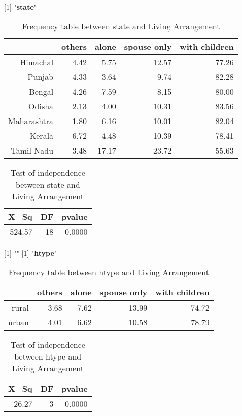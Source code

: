 \documentclass[11pt]{article}
\begin{document}
[1] "{\bf{state}}"
\begin{table}[H]
\centering
\begin{tabular}{rrrrr}
  \hline
 & others & alone & spouse only & with children \\ 
  \hline
Himachal & 4.42 & 5.75 & 12.57 & 77.26 \\ 
  Punjab & 4.33 & 3.64 & 9.74 & 82.28 \\ 
  Bengal & 4.26 & 7.59 & 8.15 & 80.00 \\ 
  Odisha & 2.13 & 4.00 & 10.31 & 83.56 \\ 
  Maharashtra & 1.80 & 6.16 & 10.01 & 82.04 \\ 
  Kerala & 6.72 & 4.48 & 10.39 & 78.41 \\ 
  Tamil Nadu & 3.48 & 17.17 & 23.72 & 55.63 \\ 
   \hline
\end{tabular}
\caption{Frequency table between state and Living Arrangement} 
\end{table}
\begin{table}[H]
\centering
\begin{tabular}{rrr}
  \hline
X\_Sq & DF & pvalue \\ 
  \hline
524.57 & 18 & 0.0000 \\ 
   \hline
\end{tabular}
\caption{Test of independence between state and Living Arrangement} 
\end{table}
[1] "\newline"
[1] "{\bf{htype}}"
\begin{table}[H]
\centering
\begin{tabular}{rrrrr}
  \hline
 & others & alone & spouse only & with children \\ 
  \hline
rural & 3.68 & 7.62 & 13.99 & 74.72 \\ 
  urban & 4.01 & 6.62 & 10.58 & 78.79 \\ 
   \hline
\end{tabular}
\caption{Frequency table between htype and Living Arrangement} 
\end{table}
\begin{table}[H]
\centering
\begin{tabular}{rrr}
  \hline
X\_Sq & DF & pvalue \\ 
  \hline
26.27 & 3 & 0.0000 \\ 
   \hline
\end{tabular}
\caption{Test of independence between htype and Living Arrangement} 
\end{table}
\end{document}
